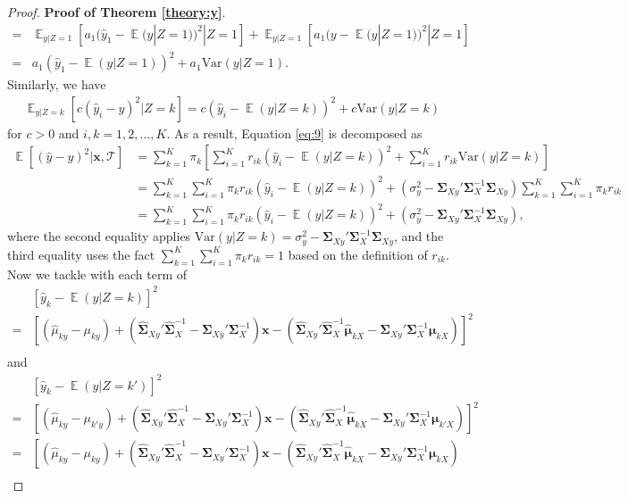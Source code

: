 \documentclass[12pt]{article}
\DeclareMathOperator{\E}{\mathbb{E}}
\begin{document}
\begin{proof}{\textbf{Proof of Theorem \ref{theory:y}}.}{}
\begin{align*}
=&\E_{y|Z=1}\left[a_1(\hat{y}_1-\E(y|Z=1))^2|Z=1\right]+\E_{y|Z=1}\left[a_1(y-\E(y|Z=1))^2|Z=1\right]\\
=& a_1(\hat{y}_1-\E(y|Z=1))^2+a_1 \mbox{Var}(y|Z=1).
\end{align*}
Similarly, we have
\begin{align*}
\E_{y|Z=k} \left[ c (\hat{y}_i - y)^2|Z=k \right]
= c(\hat{y}_i - \E(y|Z=k))^2 + c \mbox{Var}(y|Z=k)
\end{align*}
for $c > 0$ and $i, k = 1,2,\ldots,K$.
As a result, Equation \eqref{eq:9} is decomposed as
\begin{align*}
\E[(\hat{y}-y)^2|\bm x, \mathcal{T}] &= \sum_{k=1}^K \pi_k \left[ \sum_{i=1}^K r_{ik} (\hat{y}_i - \E(y|Z=k))^2 + \sum_{i=1}^K r_{ik} \mbox{Var}(y|Z=k) \right] \\
&= \sum_{k=1}^K \sum_{i=1}^K \pi_k r_{ik} (\hat{y}_i - \E(y|Z=k))^2 + (\sigma_y^2 - \bm \Sigma_{Xy}' \bm \Sigma_{X}^{-1} \bm \Sigma_{Xy}) \sum_{k=1}^K \sum_{i=1}^K \pi_k r_{ik} \\
&= \sum_{k=1}^K \sum_{i=1}^K \pi_k r_{ik} (\hat{y}_i - \E(y|Z=k))^2 + (\sigma_y^2 - \bm \Sigma_{Xy}' \bm \Sigma_{X}^{-1} \bm \Sigma_{Xy}),
\end{align*}
where the second equality applies $\mbox{Var}(y|Z=k) = \sigma_y^2 - \bm \Sigma_{Xy}' \bm \Sigma_{X}^{-1} \bm \Sigma_{Xy}$,
and the third equality uses the fact $\sum_{k=1}^K \sum_{i=1}^K \pi_k r_{ik} = 1$ based on the definition of $r_{ik}$.
Now we tackle with each term of
\begin{align*}
&[\hat{y}_k - \E(y|Z=k)]^2    \\
=&\left[(\hat{\mu}_{ky}-\mu_{ky})+\left(\hat{\bm \Sigma}_{Xy}' \hat{\bm \Sigma}_{X}^{-1}-\bm \Sigma_{Xy}' \bm \Sigma_{X}^{-1}\right) \bm x - \left(\hat{\bm \Sigma}_{Xy}' \hat{\bm \Sigma}_{X}^{-1} \hat{\bm \mu}_{kX}-\bm \Sigma_{Xy}' \bm \Sigma_{X}^{-1} \bm \mu_{kX} \right) \right]^2 \\
\end{align*}
and
\begin{align*}
&\left[\hat{y}_k-\E(y|Z=k')\right]^2  \\
=&\left[(\hat{\mu}_{ky}-\mu_{k'y})+\left(\hat{\bm \Sigma}_{Xy}' \hat{\bm \Sigma}_{X}^{-1}-\bm \Sigma_{Xy}' \bm \Sigma_{X}^{-1} \right)\bm x - \left(\hat{\bm \Sigma}_{Xy}' \hat{\bm \Sigma}_{X}^{-1} \hat{\bm \mu}_{kX}-\bm \Sigma_{Xy}' \bm \Sigma_{X}^{-1}\bm \mu_{k'X}\right)\right]^2\\
=&\left[(\hat{\mu}_{ky}-\mu_{ky})+\left(\hat{\bm \Sigma}_{Xy}' \hat{\bm \Sigma}_{X}^{-1} - \bm \Sigma_{Xy}' \bm \Sigma_{X}^{-1} \right) \bm x - \left(\hat{\bm \Sigma}_{Xy}' \hat{\bm \Sigma}_{X}^{-1} \hat{\bm \mu}_{kX}-\bm \Sigma_{Xy}' \bm \Sigma_{X}^{-1}\bm \mu_{kX}\right)\right.\\

\end{align*}
\end{proof}
\end{document}
